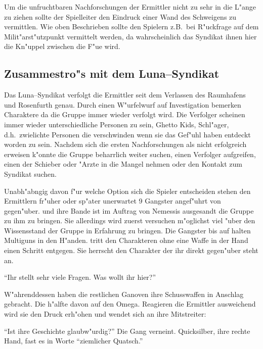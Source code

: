 \begin{remarks}
	Um die unfruchtbaren Nachforschungen der Ermittler nicht zu sehr in die L"ange zu ziehen sollte der Spielleiter den Eindruck einer Wand des Schweigens zu vermittlen. Wie oben Beschrieben sollte den Spielern z.B.~bei R"uckfrage auf dem Milit"arst"utzpunkt vermittelt werden, da\3 wahrscheinlich das Syndikat ihnen hier die Kn"uppel zwischen die F"u\3e wird.
\end{remarks}

\subsection{Zusammestro"s mit dem Luna--Syndikat}
\newcommand{\xl}{\pinyin{Xiao3} \pinyin{Long2}}
\newcommand{\xlsn}{\pinyin{Xiao3} \pinyin{Long2}}

Das Luna--Syndikat verfolgt die Ermittler seit dem Verlassen des Raumhafens und Rosenfurth genau. Durch einen W"urfelwurf auf Investigation bemerken Charaktere da\3 die Gruppe immer wieder verfolgt wird. Die Verfolger scheinen immer wieder unterschiedliche Personen zu sein, Ghetto Kids, Schl"ager, d.h.~zwielichte Personen die verschwinden wenn sie das Gef"uhl haben entdeckt worden zu sein. Nachdem sich die ersten Nachforschungen als nicht erfolgreich erweisen k"onnte die Gruppe beharrlich weiter suchen, einen Verfolger aufgreifen, einen der Schieber oder "Arzte in die Mangel nehmen oder den Kontakt zum Syndikat suchen. 

Unabh"abngig davon f"ur welche Option sich die Spieler entscheiden stehen den Ermittlern fr"uher oder sp"ater unerwartet 9 Gangster angef"uhrt von \xl{} gegen"uber. \xlsn{} und ihre Bande ist im Auftrag von Nemessis ausgesandt die Gruppe zu ihm zu bringen. Sie allerdings wird zuerst versuchen m"oglichst viel "uber den Wissensstand der Gruppe in Erfahrung zu bringen. Die Gangster bis auf \xlsn{} halten Multiguns in den H"anden. \xlsn{} tritt den Charakteren ohne eine Waffe in der Hand einen Schritt entgegen. Sie herrscht den Charakter der ihr direkt gegen"uber steht an.

"`Ihr stellt sehr viele Fragen. Was wollt ihr hier?"'

W"ahrenddessen haben die restlichen Ganoven ihre Schusswaffen in Anschlag gebracht. Die h"alfte davon auf den Omega. Reagieren die Ermittler ausweichend wird sie den Druck erh"ohen und wendet sich an ihre Mitstreiter:

"`Ist ihre Geschichte glaubw"urdig?"' Die Gang verneint. Quicksilber, ihre rechte Hand, fast es in Worte "`ziemlicher Quatsch."'

